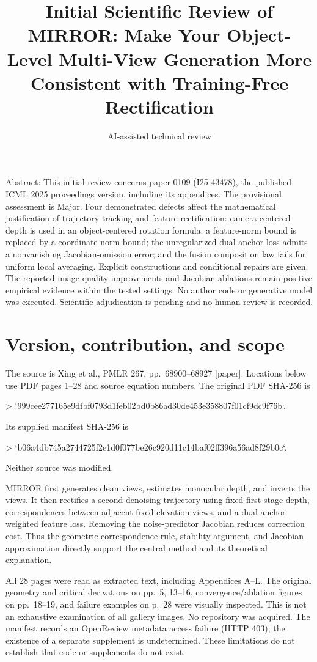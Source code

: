 \documentclass[10pt]{article}
\title{Initial Scientific Review of
MIRROR: Make Your Object-Level Multi-View Generation More Consistent with Training-Free Rectification}
\author{AI-assisted technical review}
\date{}
\begin{document}
\maketitle
Abstract: This initial review concerns paper 0109 (I25-43478), the published ICML 2025 proceedings version, including its appendices. The provisional assessment is Major. Four demonstrated defects affect the mathematical justification of trajectory tracking and feature rectification: camera-centered depth is used in an object-centered rotation formula; a feature-norm bound is replaced by a coordinate-norm bound; the unregularized dual-anchor loss admits a nonvanishing Jacobian-omission error; and the fusion composition law fails for uniform local averaging. Explicit constructions and conditional repairs are given. The reported image-quality improvements and Jacobian ablations remain positive empirical evidence within the tested settings. No author code or generative model was executed. Scientific adjudication is pending and no human review is recorded.\par
\section*{Version, contribution, and scope}
The source is Xing et al., PMLR 267, pp. 68900–68927 [paper]. Locations below use PDF pages 1–28 and source equation numbers. The original PDF SHA-256 is\par
> `999cee277165e9dfbf0793d1feb02bd0b86ad30de453e358807f01cf9dc9f76b`.\par
Its supplied manifest SHA-256 is\par
> `b06a4db745a2744725f2e1d0f077be26c920d11c14baf02ff396a56ad8f29b0c`.\par
Neither source was modified.\par
MIRROR first generates clean views, estimates monocular depth, and inverts the views. It then rectifies a second denoising trajectory using fixed first-stage depth, correspondences between adjacent fixed-elevation views, and a dual-anchor weighted feature loss. Removing the noise-predictor Jacobian reduces correction cost. Thus the geometric correspondence rule, stability argument, and Jacobian approximation directly support the central method and its theoretical explanation.\par
All 28 pages were read as extracted text, including Appendices A–L. The original geometry and critical derivations on pp. 5, 13–16, convergence/ablation figures on pp. 18–19, and failure examples on p. 28 were visually inspected. This is not an exhaustive examination of all gallery images. No repository was acquired. The manifest records an OpenReview metadata access failure (HTTP 403); the existence of a separate supplement is undetermined. These limitations do not establish that code or supplements do not exist.\par
\end{document}
